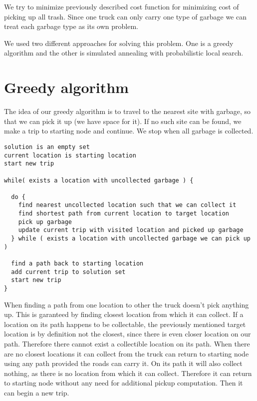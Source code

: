 \documentclass[a4paper, 12pt]{article}
\begin{document}
We try to minimize previously described cost function for minimizing cost of
picking up all trash. Since one truck can only carry one type of garbage we
can treat each garbage type as its own problem.

We used two different approaches for solving this problem. One is a greedy
algorithm and the other is simulated annealing with probabilistic local search.

\section{Greedy algorithm}

The idea of our greedy algorithm is to travel to the nearest site with garbage,
so that we can pick it up (we have space for it). If no such site can be found,
we make a trip to starting node and continue. We stop when all garbage is
collected.

\begin{lstlisting}[basicstyle=\small]
solution is an empty set
current location is starting location
start new trip

while( exists a location with uncollected garbage ) {

  do {
    find nearest uncollected location such that we can collect it
    find shortest path from current location to target location
    pick up garbage
    update current trip with visited location and picked up garbage
  } while ( exists a location with uncollected garbage we can pick up )

  find a path back to starting location
  add current trip to solution set
  start new trip
}
\end{lstlisting}

When finding a path from one location to other the truck doesn't pick anything
up. This is garanteed by finding closest location from which it can collect. If
a location on its path happens to be collectable, the previously mentioned
target location is by definition not the closest, since there is even closer
location on our path. Therefore there cannot exist a collectible location on
its path. When there are no closest locations it can collect from the truck can
return to starting node using any path provided the roads can carry it. On its
path it will also collect nothing, as there is no location from which it can
collect. Therefore it can return to starting node without any need for
additional pickup computation. Then it can begin a new trip.
\end{document}
